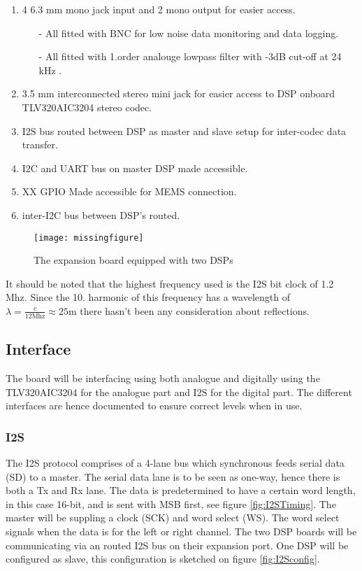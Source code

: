 \begin{enumerate}
	\item 4 6.3 mm mono jack input and 2 mono output for easier access.
	\begin{itemize}
		\item[-] All fitted with BNC for low noise data monitoring and data logging.
		\item[-] All fitted with 1.order analouge lowpass filter with -3dB cut-off at 24 kHz .
	\end{itemize}
	\item 3.5 mm interconnected stereo mini jack for easier access to DSP onboard TLV320AIC3204 stereo codec.
	\item I2S bus routed between DSP as master and slave setup for inter-codec data transfer.
	\item I2C and UART bus on master DSP made accessible.
	\item XX GPIO Made accessible for MEMS connection.
	\item inter-I2C bus between DSP's routed. 
\end{enumerate}

\begin{figure}[H]
	\centering
	\texttt{[image: missingfigure]}	
	\caption{The expansion board equipped with two DSPs}
	\label{fig:PCBboard}
\end{figure}

It should be noted that the highest frequency used is the I2S bit clock of 1.2 Mhz. Since the 10. harmonic of this frequency has a wavelength of $\lambda=\frac{c}{12 \text{Mhz}}\approx25\text{m}$ there hasn't been any consideration about reflections.






\subsection{Interface}\label{subsec:Interface}

The board will be interfacing using both analogue and digitally using the TLV320AIC3204 for the analogue part and I2S for the digital part. The different interfaces are hence documented to ensure correct levels when in use. 

\subsubsection*{I2S}

The I2S protocol comprises of a 4-lane bus which synchronous feeds serial data (SD) to a master. The serial data lane is to be seen as one-way, hence there is both a Tx and Rx lane. The data is predetermined to have a certain word length, in this case 16-bit, and is sent with MSB first, see figure \ref{fig:I2STiming}. The master will be suppling a clock (SCK) and word select (WS). The word select signals when the data is for the left or right channel. The two DSP boards will be communicating via an routed I2S bus on their expansion port. One DSP will be configured as slave, this configuration is sketched on figure \ref{fig:I2Sconfig}. 

